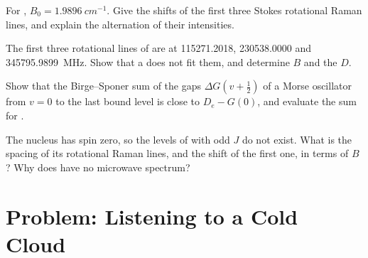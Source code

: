\begin{exercise}[$\star\star$]\label{exo:b3:rovibrational-spectroscopy:9}
For , $B_0 = \qty{1.9896}{cm^{-1}}$. Give the shifts of the first three
Stokes rotational Raman lines, and explain the alternation of their
intensities.
\end{exercise}

\begin{exercise}[$\star\star\star$]\label{exo:b3:rovibrational-spectroscopy:10}
The first three rotational lines of  are at 115271.2018,
230538.0000 and \qty{345795.9899}{MHz}. Show that a  does not fit them,
and determine $B$ and the  $D$.
\end{exercise}

\begin{exercise}[$\star\star\star$]\label{exo:b3:rovibrational-spectroscopy:11}
Show that the Birge--Sponer sum of the gaps $\Delta G(v + \frac12)$ of a Morse
oscillator from $v = 0$ to the last bound level is close to $D_e - G(0)$, and
evaluate the sum for .
\end{exercise}

\begin{exercise}[$\star\star\star$]\label{exo:b3:rovibrational-spectroscopy:12}
The  nucleus has spin zero, so the levels of  with odd
$J$ do not exist. What is the spacing of its rotational Raman lines, and the
shift of the first one, in terms of $B$? Why does  have no microwave
spectrum?
\end{exercise}

\section{Problem: Listening to a Cold Cloud}

